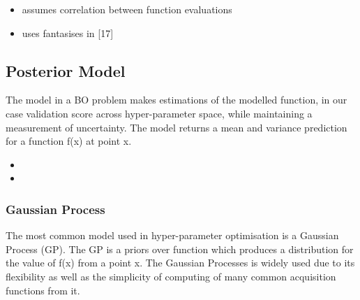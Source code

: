 \documentclass{article}
\begin{document}
	\begin{itemize}

	\item assumes correlation between function evaluations

	\item uses fantasises in [17]

	\end{itemize}



	\subsection{Posterior Model}

		The model in a BO problem makes estimations of the modelled function, in our case validation score across hyper-parameter space, while maintaining a measurement of uncertainty. The model returns a mean and variance prediction for a function f(x) at point x. \cite{35} 

		\begin{itemize}

		\item 

		\item 

		\end{itemize}




		\subsubsection{Gaussian Process}

			The most common model used in hyper-parameter optimisation is a Gaussian Process (GP)\cite{17}. The GP is a priors over function which produces a distribution for the value of f(x) from a point x. The Gaussian Processes is widely used due to its flexibility as well as the simplicity of computing of many common acquisition functions from it.
\end{document}
